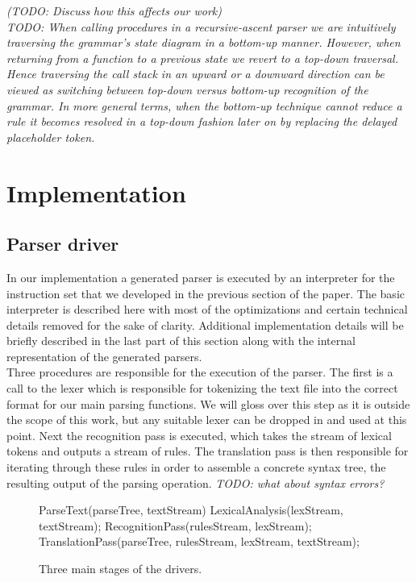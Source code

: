 \documentclass[a4paper,11pt]{article}
\begin{document}
\emph{ (TODO: Discuss how this affects our work) }\\


\emph{TODO:
When calling procedures in a recursive-ascent parser we are intuitively traversing the grammar's state diagram in a bottom-up manner.
However, when returning from a function to a previous state we revert to a top-down traversal.
Hence traversing the call stack in an upward or a downward direction can be viewed as switching between top-down versus bottom-up recognition of the grammar. 
In more general terms, when the bottom-up technique cannot reduce a rule it becomes resolved in a top-down fashion later on by replacing the delayed placeholder token.}

\section{Implementation}
\subsection{Parser driver}

In our implementation a generated parser is executed by an interpreter for the instruction set that we developed in the previous section of the paper.
The basic interpreter is described here with most of the optimizations and certain technical details removed for the sake of clarity. 
Additional implementation details will be briefly described in the last part of this section along with the internal representation of the generated parsers.\\

Three procedures are responsible for the execution of the parser. 
The first is a call to the lexer which is responsible for tokenizing the text file into the correct format for our main parsing functions.
We will gloss over this step as it is outside the scope of this work, but any suitable lexer can be dropped in and used at this point.
Next the recognition pass is executed, which takes the stream of lexical tokens and outputs a stream of rules. 
The translation pass is then responsible for iterating through these rules in order to assemble a concrete syntax tree, the resulting output of the parsing operation.
\emph{TODO: what about syntax errors?}

\begin{figure}[!ht]
\begin{center}
\begin{gcl}
\PROC ParseText(parseTree, textStream)
LexicalAnalysis(lexStream, textStream);
RecognitionPass(rulesStream, lexStream);
TranslationPass(parseTree, rulesStream, lexStream, textStream);
\CORP
\end{gcl}
\caption{Three main stages of the drivers.}
\end{center}
\end{figure}
\end{document}
